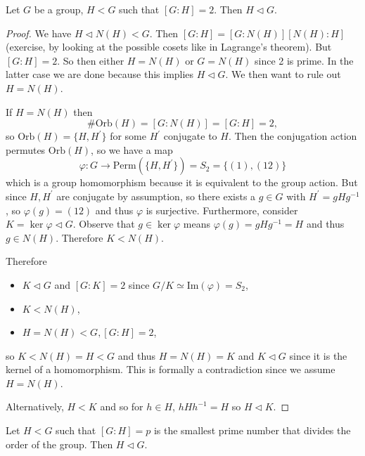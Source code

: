 \documentclass{article}
\begin{document}
\begin{prop}
Let $G$ be a group, $H < G$ such that $[G : H] = 2$. 
Then $H \triangleleft G$.
\end{prop}
\begin{proof}
We have $H \triangleleft N(H) < G$. Then
$[G : H] = [G : N(H)][N(H) : H]$ (exercise, by looking at the possible
cosets like in Lagrange's theorem).
But $[G : H] = 2$. So then either $H = N(H)$ or $G = N(H)$ since 2 is
prime. In the latter case we are done because this implies 
$H \triangleleft G$. We then want to rule out $H = N(H)$.

If $H = N(H)$ then 
$$
\# \mathrm{Orb}(H) = [G : N(H)] = [G : H] = 2,
$$
so $\mathrm{Orb}(H) = \{H, H^\prime \}$ for some $H^\prime$ conjugate
to $H$. Then the conjugation action permutes $\mathrm{Orb}(H)$, so 
we have a map 
$$
\varphi : G \to \mathrm{Perm}(\{H, H^\prime\}) = S_2 = \{(1), (1 2)\}
$$
which is a group homomorphism because it is equivalent to the group
action. But since $H, H^\prime$ are conjugate by assumption, so there
exists a $g \in G$ with $H^\prime = g H g^{-1}$, so $\varphi(g) = (1 2)$
and thus $\varphi$ is surjective. Furthermore, consider
$K = \ker \varphi \triangleleft G$. Observe that $g \in \ker \varphi$
means $\varphi(g) = g H g^{-1} = H$ and thus $g \in N(H)$. Therefore
$K < N(H)$.

Therefore
\begin{itemize}
  \item{$K \triangleleft G$ and $[G : K] = 2$ since 
        $G/K \simeq \mathrm{Im}(\varphi) = S_2$,}
  \item{$K < N(H)$,}
  \item{$H = N(H) < G, [G : H] = 2$,}
\end{itemize}
so $K < N(H) = H < G$ and thus $H = N(H) = K$ and
$K \triangleleft G$ since it is the kernel of a homomorphism.
This is formally a contradiction since we assume $H = N(H)$.

Alternatively, $H < K$ and so for $h \in H$, 
$h H h^{-1} = H$ so $H \triangleleft K$.
\end{proof}

\begin{exer}
Let $H < G$ such that $[G : H] = p$ is the smallest prime number that
divides the order of the group. Then $H \triangleleft G$.
\end{exer}
\end{document}
